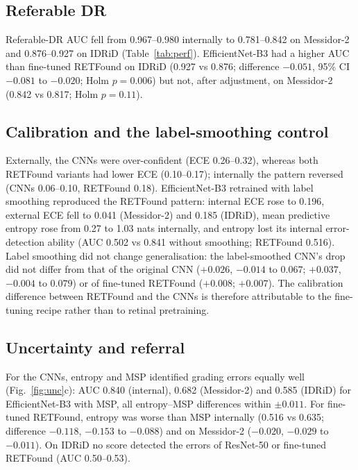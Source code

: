 \documentclass[pdflatex,sn-basic,Numbered]{sn-jnl}
\begin{document}
\subsection{Referable DR}

Referable-DR AUC fell from 0.967--0.980 internally to 0.781--0.842 on Messidor-2 and 0.876--0.927 on IDRiD (Table~\ref{tab:perf}). EfficientNet-B3 had a higher AUC than fine-tuned RETFound on IDRiD (0.927 vs 0.876; difference $-0.051$, 95\% CI $-0.081$ to $-0.020$; Holm $p=0.006$) but not, after adjustment, on Messidor-2 (0.842 vs 0.817; Holm $p=0.11$).

\subsection{Calibration and the label-smoothing control}

Externally, the CNNs were over-confident (ECE 0.26--0.32), whereas both RETFound variants had lower ECE (0.10--0.17); internally the pattern reversed (CNNs 0.06--0.10, RETFound 0.18). EfficientNet-B3 retrained with label smoothing reproduced the RETFound pattern: internal ECE rose to 0.196, external ECE fell to 0.041 (Messidor-2) and 0.185 (IDRiD), mean predictive entropy rose from 0.27 to 1.03 nats internally, and entropy lost its internal error-detection ability (AUC 0.502 vs 0.841 without smoothing; RETFound 0.516). Label smoothing did not change generalisation: the label-smoothed CNN's drop did not differ from that of the original CNN ($+0.026$, $-0.014$ to $0.067$; $+0.037$, $-0.004$ to $0.079$) or of fine-tuned RETFound ($+0.008$; $+0.007$). The calibration difference between RETFound and the CNNs is therefore attributable to the fine-tuning recipe rather than to retinal pretraining.

\subsection{Uncertainty and referral}

For the CNNs, entropy and MSP identified grading errors equally well (Fig.~\ref{fig:unc}c): AUC 0.840 (internal), 0.682 (Messidor-2) and 0.585 (IDRiD) for EfficientNet-B3 with MSP, all entropy--MSP differences within $\pm0.011$. For fine-tuned RETFound, entropy was worse than MSP internally (0.516 vs 0.635; difference $-0.118$, $-0.153$ to $-0.088$) and on Messidor-2 ($-0.020$, $-0.029$ to $-0.011$). On IDRiD no score detected the errors of ResNet-50 or fine-tuned RETFound (AUC 0.50--0.53).
\end{document}
